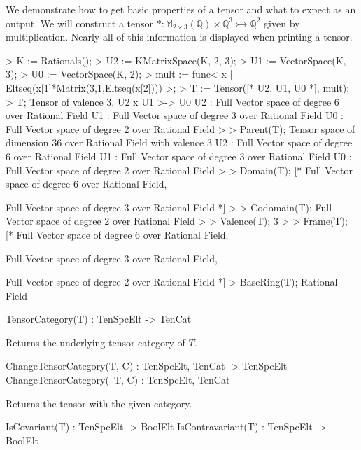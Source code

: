 \begin{example}[BasicProps]

We demonstrate how to get basic properties of a tensor and what to expect as an output.
We will construct a tensor $*:\mathbb{M}_{2\times 3}(\mathbb{Q})\times \mathbb{Q}^3\rightarrowtail \mathbb{Q}^2$ given by multiplication.
Nearly all of this information is displayed when printing a tensor.
\begin{code}
> K := Rationals();
> U2 := KMatrixSpace(K, 2, 3);
> U1 := VectorSpace(K, 3);
> U0 := VectorSpace(K, 2);
> mult := func< x | Eltseq(x[1]*Matrix(3,1,Eltseq(x[2]))) >;
> T := Tensor([* U2, U1, U0 *], mult);
> T;
Tensor of valence 3, U2 x U1 >-> U0
U2 : Full Vector space of degree 6 over Rational Field
U1 : Full Vector space of degree 3 over Rational Field
U0 : Full Vector space of degree 2 over Rational Field
> 
> Parent(T);
Tensor space of dimension 36 over Rational Field with valence 3
U2 : Full Vector space of degree 6 over Rational Field
U1 : Full Vector space of degree 3 over Rational Field
U0 : Full Vector space of degree 2 over Rational Field
> 
> Domain(T);
[*
    Full Vector space of degree 6 over Rational Field,

    Full Vector space of degree 3 over Rational Field
*]
> 
> Codomain(T);
Full Vector space of degree 2 over Rational Field
> 
> Valence(T);
3
> 
> Frame(T);
[*
    Full Vector space of degree 6 over Rational Field,

    Full Vector space of degree 3 over Rational Field,

    Full Vector space of degree 2 over Rational Field
*]
> BaseRing(T);
Rational Field
\end{code}
\end{example}

\begin{intrinsics}
TensorCategory(T) : TenSpcElt -> TenCat
\end{intrinsics}

Returns the underlying tensor category of $T$.

\begin{intrinsics}
ChangeTensorCategory(T, C) : TenSpcElt, TenCat -> TenSpcElt
ChangeTensorCategory(~T, C) : TenSpcElt, TenCat
\end{intrinsics}

Returns the tensor with the given category.

\begin{intrinsics}
IsCovariant(T) : TenSpcElt -> BoolElt
IsContravariant(T) : TenSpcElt -> BoolElt
\end{intrinsics}

